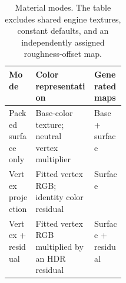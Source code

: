 \documentclass[11pt,letterpaper]{article}
\begin{document}
\begin{table}[htbp]
\centering
\caption{Material modes. The table excludes shared engine textures, constant defaults, and an independently assigned roughness-offset map.}
\label{tab:modes}
\begin{tabularx}{\linewidth}{@{}p{0.23\linewidth}Y C{1.05in}@{}}
\toprule
Mode & Color representation & Generated maps \\
\midrule
Packed surface only & Base-color texture; neutral vertex multiplier & Base + surface \\
Vertex projection & Fitted vertex RGB; identity color residual & Surface \\
Vertex + residual & Fitted vertex RGB multiplied by an HDR residual & Surface + residual \\
\bottomrule
\end{tabularx}
\end{table}
\end{document}
